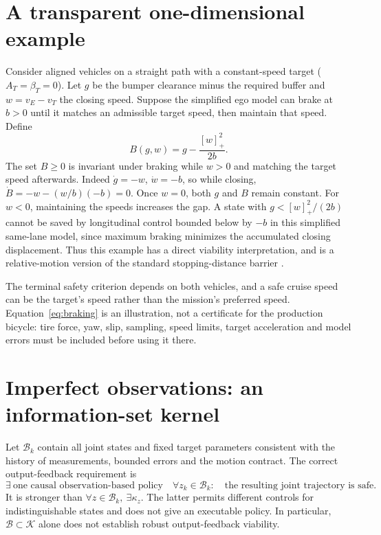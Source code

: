 \documentclass[11pt]{article}
\newcommand{\K}{\mathcal K}
\newcommand{\B}{\mathcal B}
\begin{document}
\section{A transparent one-dimensional example}
Consider aligned vehicles on a straight path with a constant-speed target
($A_T=\beta_T=0$). Let $g$ be the bumper clearance minus the required
buffer and $w=v_E-v_T$ the closing speed. Suppose the simplified ego
model can brake at $b>0$ until it matches an admissible target speed, then
maintain that speed. Define
\begin{equation}
B(g,w)=g-\frac{[w]_+^2}{2b}.\label{eq:braking}
\end{equation}
The set $B\geq0$ is invariant under braking while $w>0$ and matching the
target speed afterwards. Indeed $\dot g=-w$, $\dot w=-b$, so while closing,
$\dot B=-w-(w/b)(-b)=0$. Once $w=0$, both $g$ and $B$ remain constant.
For $w<0$, maintaining the speeds increases the gap. A state with
$g<[w]_+^2/(2b)$ cannot be saved by longitudinal control bounded below by
$-b$ in this simplified same-lane model, since maximum braking minimizes
the accumulated closing displacement. Thus this example has a direct
viability interpretation, and is a relative-motion version of the standard
stopping-distance barrier \cite{backup}.

The terminal safety criterion depends on both vehicles, and a safe cruise
speed can be the target's speed rather than the mission's preferred speed.
Equation~\eqref{eq:braking} is an illustration, not a certificate for the
production bicycle: tire force, yaw, slip, sampling, speed limits, target
acceleration and model errors must be included before using it there.

\section{Imperfect observations: an information-set kernel}
Let $\B_k$ contain all joint states and fixed target parameters consistent
with the history of measurements, bounded errors and the motion contract.
The correct output-feedback requirement is
\begin{equation}
\exists\ \text{one causal observation-based policy}\quad
\forall z_k\in\B_k:\quad \text{the resulting joint trajectory is safe}.
\end{equation}
It is stronger than $\forall z\in\B_k,\ \exists\kappa_z$.
The latter permits different controls for indistinguishable states and
does not give an executable policy. In particular, $\B\subset\K$ alone
does not establish robust output-feedback viability.
\end{document}
